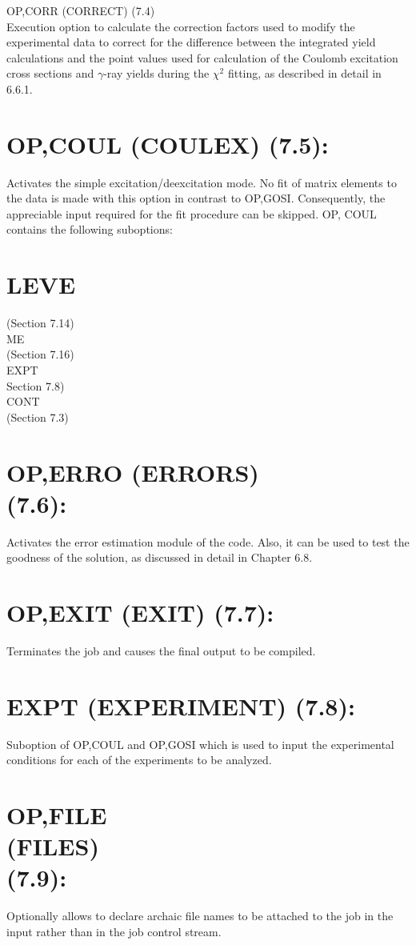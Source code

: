 \documentclass[10pt]{article}
\begin{document}
OP,CORR (CORRECT) (7.4)\\
Execution option to calculate the correction factors used to modify the experimental data to correct for the difference between the integrated yield calculations and the point values used for calculation of the Coulomb excitation cross sections and $\gamma$-ray yields during the $\chi^{2}$ fitting, as described in detail in 6.6.1.

\section*{OP,COUL (COULEX) (7.5):}
Activates the simple excitation/deexcitation mode. No fit of matrix elements to the data is made with this option in contrast to OP,GOSI. Consequently, the appreciable input required for the fit procedure can be skipped. OP, COUL contains the following suboptions:

\section*{LEVE}
(Section 7.14)\\
ME\\
(Section 7.16)\\
EXPT\\
Section 7.8)\\
CONT\\
(Section 7.3)

\section*{OP,ERRO (ERRORS) \\
 (7.6):}
Activates the error estimation module of the code. Also, it can be used to test the goodness of the solution, as discussed in detail in Chapter 6.8.

\section*{OP,EXIT (EXIT) (7.7):}
Terminates the job and causes the final output to be compiled.

\section*{EXPT (EXPERIMENT) (7.8):}
Suboption of OP,COUL and OP,GOSI which is used to input the experimental conditions for each of the experiments to be analyzed.

\section*{OP,FILE \\
 (FILES) \\
 (7.9):}
Optionally allows to declare archaic file names to be attached to the job in the input rather than in the job control stream.
\end{document}
